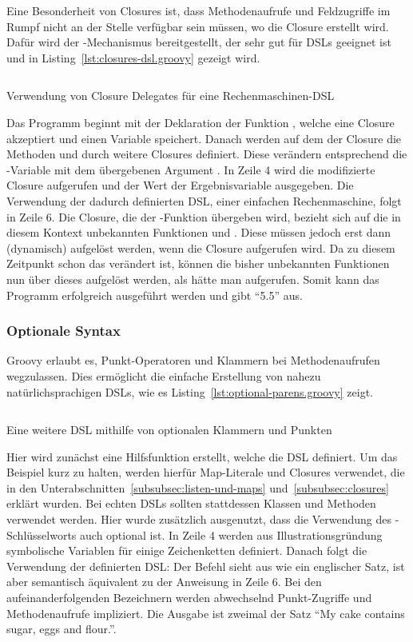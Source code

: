 \documentclass[a4paper]{article}
\newcommand{\outquote}[1]{``{#1}''}
\newcommand{\codelisting}[3]{\begin{listing}[htp]
	\inputminted{#1}{#1/#2}
	\vspace{-3ex}
	\caption{#3}
	\label{lst:#2}
\end{listing}}
\begin{document}
Eine Besonderheit von Closures ist, dass Methodenaufrufe und Feldzugriffe im Rumpf nicht an der Stelle verfügbar sein müssen, wo die Closure erstellt wird.
Dafür wird der -Mechanismus bereitgestellt, der sehr gut für DSLs geeignet ist und in Listing~\ref{lst:closures-dsl.groovy} gezeigt wird.

\codelisting{groovy}{closures-dsl.groovy}{Verwendung von Closure Delegates für eine Rechenmaschinen-DSL}

Das Programm beginnt mit der Deklaration der Funktion , welche eine Closure akzeptiert und einen Variable  speichert.
Danach werden auf dem  der Closure die Methoden  und  durch weitere Closures definiert.
Diese verändern entsprechend die -Variable mit dem übergebenen Argument .
In Zeile 4 wird die modifizierte Closure aufgerufen und der Wert der Ergebnisvariable ausgegeben.
Die Verwendung der dadurch definierten DSL, einer einfachen Rechenmaschine, folgt in Zeile 6.
Die Closure, die der -Funktion übergeben wird, bezieht sich auf die in diesem Kontext unbekannten Funktionen  und .
Diese müssen jedoch erst dann (dynamisch) aufgelöst werden, wenn die Closure aufgerufen wird.
Da zu diesem Zeitpunkt schon das  verändert ist, können die bisher unbekannten Funktionen nun über dieses aufgelöst werden, als hätte man  aufgerufen.
Somit kann das Programm erfolgreich ausgeführt werden und gibt \outquote{5.5} aus.

\subsubsection{Optionale Syntax}\label{subsubsec:optionale-syntax}

Groovy erlaubt es, Punkt-Operatoren und Klammern bei Methodenaufrufen wegzulassen.
Dies ermöglicht die einfache Erstellung von nahezu natürlichsprachigen DSLs, wie es Listing~\ref{lst:optional-parens.groovy} zeigt.

\codelisting{groovy}{optional-parens.groovy}{Eine weitere DSL mithilfe von optionalen Klammern und Punkten}

Hier wird zunächst eine Hilfsfunktion  erstellt, welche die DSL definiert.
Um das Beispiel kurz zu halten, werden hierfür Map-Literale und Closures verwendet, die in den Unterabschnitten~\ref{subsubsec:listen-und-maps} und~\ref{subsubsec:closures} erklärt wurden.
Bei echten DSLs sollten stattdessen Klassen und Methoden verwendet werden.
Hier wurde zusätzlich ausgenutzt, dass die Verwendung des -Schlüsselworts auch optional ist.
In Zeile 4 werden aus Illustrationsgründung symbolische Variablen für einige Zeichenketten definiert.
Danach folgt die Verwendung der definierten DSL:
Der Befehl sieht aus wie ein englischer Satz, ist aber semantisch äquivalent zu der Anweisung in Zeile 6.
Bei den aufeinanderfolgenden Bezeichnern werden abwechselnd Punkt-Zugriffe und Methodenaufrufe impliziert.
Die Ausgabe ist zweimal der Satz \outquote{My cake contains sugar, eggs and flour.}.
\end{document}
